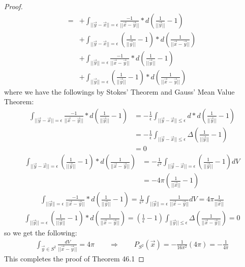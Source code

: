 \documentclass[15pt]{book}
\theoremstyle{break}
\theoremstyle{break}
\begin{document}
\begin{proof}
\begin{align*}
=&+\int_{||\vec{y} - \vec{x}|| = \epsilon} \frac{-1}{||\vec{x}-\vec{y}||}*d\left(\frac{1}{||\vec{y}||} - 1\right)\\
&+\int_{||\vec{y} - \vec{x}|| = \epsilon}\left( \frac{1}{||\vec{y}||}-1\right)*d\left(\frac{1}{||\vec{x}-\vec{y}||}\right)\\
&+\int_{||\vec{y} || = \epsilon} \frac{-1}{||\vec{x}-\vec{y}||}*d\left(\frac{1}{||\vec{y}||} - 1\right)\\
&+\int_{||\vec{y}|| = \epsilon}\left( \frac{1}{||\vec{y}||}-1\right)*d\left(\frac{1}{||\vec{x}-\vec{y}||}\right)
\end{align*}
where we have the followings by Stokes' Theorem and Gauss' Mean Value Theorem:
\begin{align*}
\int_{||\vec{y} - \vec{x}|| = \epsilon} \frac{-1}{||\vec{x}-\vec{y}||}*d\left(\frac{1}{||\vec{y}||} - 1\right) 
&= -\frac{1}{\epsilon}\int_{||\vec{y}-\vec{x}|| \leq \epsilon} d*d\left(\frac{1}{||\vec{y}||}-1\right)\\
&= -\frac{1}{\epsilon}\int_{||\vec{y}-\vec{x}|| \leq \epsilon} \Delta\left(\frac{1}{||\vec{y}||}-1\right) \\
&= 0
\end{align*}
\begin{align*}
\int_{||\vec{y} - \vec{x}|| = \epsilon}\left( \frac{1}{||\vec{y}||}-1\right)*d\left(\frac{1}{||\vec{x}-\vec{y}||}\right) 
&= -\frac{1}{\epsilon^2}\int_{||\vec{y}-\vec{x}|| = \epsilon}\left( \frac{1}{||\vec{y}||}-1\right) dV \\
&= -4\pi \left( \frac{1}{||\vec{x}||}-1\right)
\end{align*}
\begin{align*}
\int_{||\vec{y} || = \epsilon} \frac{-1}{||\vec{x}-\vec{y}||}*d\left(\frac{1}{||\vec{y}||} - 1\right) = \frac{1}{\epsilon^2}\int_{||\vec{y} || = \epsilon} \frac{1}{||\vec{x} - \vec{y}||}dV = 4\pi \frac{1}{||\vec{x}||}
\end{align*}
\begin{align*}
\int_{||\vec{y}|| = \epsilon}\left( \frac{1}{||\vec{y}||}-1\right)*d\left(\frac{1}{||\vec{x}-\vec{y}||}\right) = \left(\frac{1}{\epsilon}-1\right)\int_{||\vec{y}||\leq \epsilon} \Delta\left( \frac{1}{||\vec{x}-\vec{y}||}\right) = 0
\end{align*}
so we get the following:
\begin{align*}
\int_{\vec{y}\in S^2}\frac{dV}{||\vec{x}-\vec{y}||}  = 4\pi \qquad\Rightarrow\qquad P_{S^2}(\vec{x}) = -\frac{1}{16\pi^2}(4\pi) = -\frac{1}{4\pi}
\end{align*}
This completes the proof of Theorem 46.1
\end{proof}
\newpage
\end{document}
